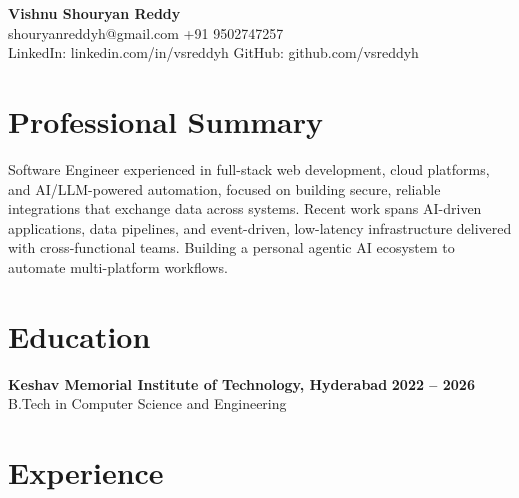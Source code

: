 \documentclass[a4paper,11pt]{article}
\newcommand{\resumeSubheading}[4]{%
  \textbf{#1} \hfill \textbf{#2} \\
{#3} \hfill {#4}
}
\begin{document}
\pagestyle{empty}
\raggedbottom
\addtolength{\textheight}{2\baselineskip}
\small

\begin{center}
  {\LARGE \textbf{Vishnu Shouryan Reddy}}\\[0.3em]
  shouryanreddyh@gmail.com \textbar{} +91 9502747257 \\[0.3em]
  LinkedIn: linkedin.com/in/vsreddyh \textbar{} GitHub: github.com/vsreddyh
\end{center}
\vspace{-0.8em}

\section*{Professional Summary}

Software Engineer experienced in full-stack web development, cloud platforms, and AI/LLM-powered automation, focused on building secure, reliable integrations that exchange data across systems. Recent work spans AI-driven applications, data pipelines, and event-driven, low-latency infrastructure delivered with cross-functional teams. Building a personal agentic AI ecosystem to automate multi-platform workflows.

\section*{Education}

\resumeSubheading
{Keshav Memorial Institute of Technology, Hyderabad}{2022 -- 2026}
{B.Tech in Computer Science and Engineering}{}


\section*{Experience}
\end{document}
